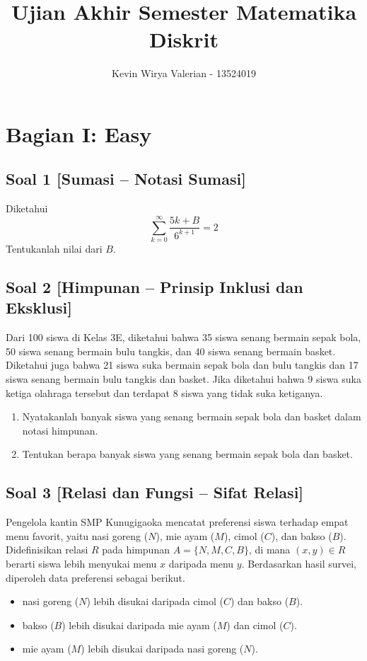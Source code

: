 \documentclass[12pt,a4paper]{article}
\title{\textbf{Ujian Akhir Semester Matematika Diskrit}}
\author{Kevin Wirya Valerian - 13524019}
\date{}
\begin{document}
\maketitle

\section*{Bagian I: Easy}

\subsection*{Soal 1 [Sumasi -- Notasi Sumasi]}
Diketahui
\[ \sum_{k=0}^{\infty} \frac{5k + B}{6^{k+1}} = 2 \]
Tentukanlah nilai dari $B$.

\subsection*{Soal 2 [Himpunan -- Prinsip Inklusi dan Eksklusi]}
Dari 100 siswa di Kelas 3E, diketahui bahwa 35 siswa senang bermain sepak bola, 50 siswa senang bermain bulu tangkis, dan 40 siswa senang bermain basket. Diketahui juga bahwa 21 siswa suka bermain sepak bola dan bulu tangkis dan 17 siswa senang bermain bulu tangkis dan basket. Jika diketahui bahwa 9 siswa suka ketiga olahraga tersebut dan terdapat 8 siswa yang tidak suka ketiganya. 
\begin{enumerate}[label=(\alph*)]
    \item Nyatakanlah banyak siswa yang senang bermain sepak bola dan basket dalam notasi himpunan.
    \item Tentukan berapa banyak siswa yang senang bermain sepak bola dan basket.
\end{enumerate}

\subsection*{Soal 3 [Relasi dan Fungsi -- Sifat Relasi]}
Pengelola kantin SMP Kunugigaoka mencatat preferensi siswa terhadap empat menu favorit, yaitu nasi goreng ($N$), mie ayam ($M$), cimol ($C$), dan bakso ($B$). Didefinisikan relasi $R$ pada himpunan $A = \{N, M, C, B\}$, di mana $(x, y) \in R$ berarti siswa lebih menyukai menu $x$ daripada menu $y$. Berdasarkan hasil survei, diperoleh data preferensi sebagai berikut.
\begin{itemize}
    \item nasi goreng ($N$) lebih disukai daripada cimol ($C$) dan bakso ($B$).
    \item bakso ($B$) lebih disukai daripada mie ayam ($M$) dan cimol ($C$).
    \item mie ayam ($M$) lebih disukai daripada nasi goreng ($N$).
\end{itemize}
\end{document}
